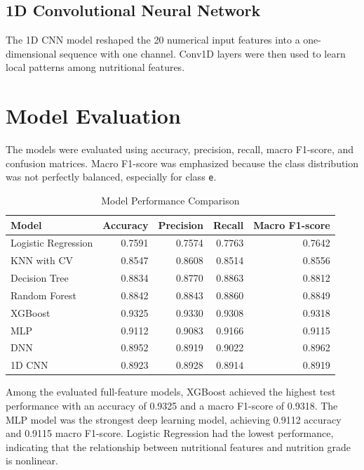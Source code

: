 \documentclass[conference]{IEEEtran}
\begin{document}
\subsection{1D Convolutional Neural Network}
The 1D CNN model reshaped the 20 numerical input features into a one-dimensional sequence with one channel. Conv1D layers were then used to learn local patterns among nutritional features.

\section{Model Evaluation}
The models were evaluated using accuracy, precision, recall, macro F1-score, and confusion matrices. Macro F1-score was emphasized because the class distribution was not perfectly balanced, especially for class \texttt{e}.

\begin{table}[htbp]
\caption{Model Performance Comparison}
\begin{center}
\begin{tabular}{lrrrr}
\toprule
\textbf{Model} & \textbf{Accuracy} & \textbf{Precision} & \textbf{Recall} & \textbf{Macro F1-score} \\
\midrule
Logistic Regression & 0.7591 & 0.7574 & 0.7763 & 0.7642 \\
KNN with CV & 0.8547 & 0.8608 & 0.8514 & 0.8556 \\
Decision Tree & 0.8834 & 0.8770 & 0.8863 & 0.8812 \\
Random Forest & 0.8842 & 0.8843 & 0.8860 & 0.8849 \\
XGBoost & 0.9325 & 0.9330 & 0.9308 & 0.9318 \\
MLP & 0.9112 & 0.9083 & 0.9166 & 0.9115 \\
DNN & 0.8952 & 0.8919 & 0.9022 & 0.8962 \\
1D CNN & 0.8923 & 0.8928 & 0.8914 & 0.8919 \\
\bottomrule
\end{tabular}
\label{tab:model-comparison}
\end{center}
\end{table}

Among the evaluated full-feature models, XGBoost achieved the highest test performance with an accuracy of 0.9325 and a macro F1-score of 0.9318. The MLP model was the strongest deep learning model, achieving 0.9112 accuracy and 0.9115 macro F1-score. Logistic Regression had the lowest performance, indicating that the relationship between nutritional features and nutrition grade is nonlinear.
\end{document}
